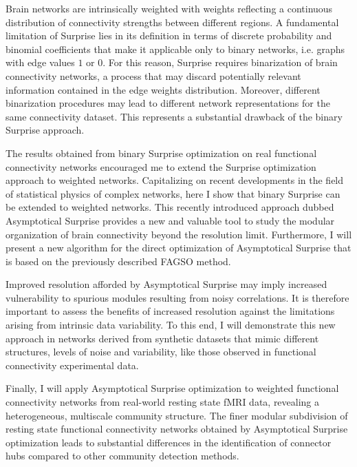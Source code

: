 Brain networks are intrinsically weighted with weights reflecting a continuous distribution of connectivity strengths between different regions.
A fundamental limitation of Surprise lies in its definition in terms of discrete probability and binomial coefficients that make it applicable only to binary networks, i.e.
graphs with edge values $1$ or $0$.
For this reason, Surprise requires binarization of brain connectivity networks, a process that may discard potentially relevant information contained in the edge weights distribution.
Moreover, different binarization procedures may lead to different network representations for the same connectivity dataset.
This represents a substantial drawback of the binary Surprise approach.

The results obtained from binary Surprise optimization on real functional connectivity networks encouraged me to extend the Surprise optimization approach to weighted networks. 
Capitalizing on recent developments in the field of statistical physics of complex networks, here I show that binary Surprise can be extended to weighted networks.
This recently introduced approach dubbed Asymptotical Surprise provides a new and valuable tool to study the modular organization of brain connectivity beyond the resolution limit.
Furthermore, I will present a new algorithm for the direct optimization of Asymptotical Surprise that is based on the previously described FAGSO method.

Improved resolution afforded by Asymptotical Surprise may imply increased vulnerability to spurious modules resulting from noisy correlations.
It is therefore important to assess the benefits of increased resolution against the limitations arising from intrinsic data variability.
To this end, I will demonstrate this new approach in networks derived from synthetic datasets that mimic different structures, levels of noise and variability, like those observed in functional connectivity experimental data.

Finally, I will apply Asymptotical Surprise optimization to weighted functional connectivity networks from real-world resting state fMRI data, revealing a heterogeneous, multiscale community structure.
The finer modular subdivision of resting state functional connectivity networks obtained by Asymptotical Surprise optimization leads to substantial differences in the identification of connector hubs compared to other community detection methods.

